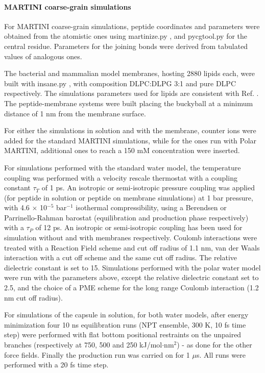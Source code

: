 \paragraph{MARTINI coarse-grain simulations}
For MARTINI \cite{Marrink2007, Monticelli2008} coarse-grain simulations, peptide coordinates and parameters were obtained from the atomistic ones using martinize.py \cite{DeJong2013}, and pycgtool.py \cite{Graham2017} for the central residue. Parameters for the joining bonds were derived from tabulated values of analogous ones.

The bacterial and mammalian model membranes, hosting 2880 lipids each, were built with insane.py \cite{Wassenaar2015}, with composition DLPC:DLPG 3:1 and pure DLPC respectively. The simulations parameters used for lipids are consistent with Ref. \cite{SiewertJ.Marrink2003}. The peptide-membrane systems were built placing the buckyball at a minimum distance of 1 nm from the membrane surface.

For either the simulations in solution and with the membrane, counter ions were added for the standard MARTINI simulations, while for the ones run with Polar MARTINI, additional ones to reach a 150 mM concentration were inserted.

For simulations performed with the standard water model, the temperature coupling was performed with a velocity rescale thermostat \cite{Bussi2007} with a coupling constant $\tau _T$ of 1 ps. An isotropic or semi-isotropic pressure coupling was applied (for peptide in solution or peptide on membrane simulations) at 1 bar pressure, with 4.6 $\times$ 10$^{-5}$ bar$^{-1}$ isothermal compressibility, using a Berendsen \cite{Berendsen1984} or Parrinello-Rahman barostat \cite{Parrinello1981} (equilibration and production phase respectively) with a $\tau _P$ of 12 ps. An isotropic or semi-isotropic coupling has been used for simulation without and with membranes respectively.
%
Coulomb interactions were treated with a Reaction Field scheme \cite{Tironi1995} and cut off radius of 1.1 nm, van der Waals interaction with a cut off scheme and the same cut off radius. The relative dielectric constant is set to 15.
%
Simulations performed with the polar water model were run with the parameters above, except the relative dielectric constant set to 2.5, and the choice of a PME scheme for the long range Coulomb interaction (1.2 nm cut off radius).

For simulations of the capsule in solution, for both water models, after energy minimization four 10 ns equilibration runs (NPT ensemble, 300 K, 10 fs time step) were performed with flat bottom positional restraints on the unpaired branches (respectively at 750, 500 and 250 kJ/mol$\cdot$nm$^2$) - as done for the other force fields.
%
Finally the production run was carried on for 1 $\mu$s. All runs were performed with a 20 fs time step.

